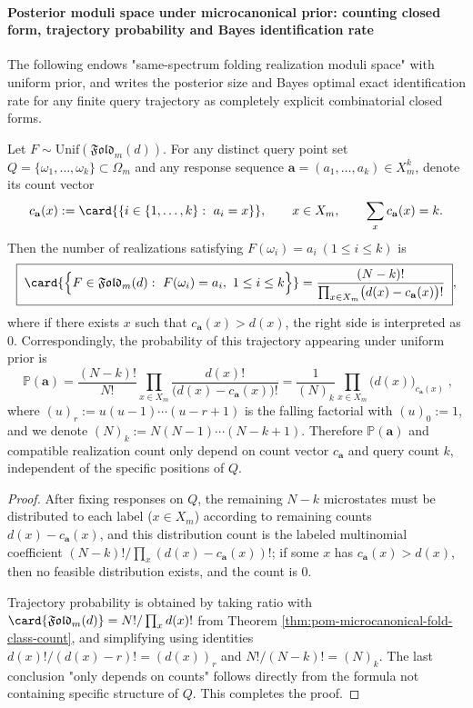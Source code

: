 \paragraph{Posterior moduli space under microcanonical prior: counting closed form, trajectory probability and Bayes identification rate}
The following endows "same-spectrum folding realization moduli space" with uniform prior, and writes the posterior size and Bayes optimal exact identification rate for any finite query trajectory as completely explicit combinatorial closed forms.

\begin{theorem}\label{thm:pom-microcanonical-fold-posterior-count-and-prob}
Let \(F\sim\mathrm{Unif}(\mathfrak{Fold}_m(d))\).
For any distinct query point set \(Q=\{\omega_1,\dots,\omega_k\}\subset\Omega_m\) and any response sequence \(\mathbf{a}=(a_1,\dots,a_k)\in X_m^k\), denote its count vector
\[
c_{\mathbf{a}}(x):=\card{\{i\in\{1,\dots,k\}:\ a_i=x\}},\qquad x\in X_m,\qquad \sum_{x}c_{\mathbf{a}}(x)=k.
\]
Then the number of realizations satisfying \(F(\omega_i)=a_i\ (1\le i\le k)\) is
\[
\boxed{\;
\card{\Bigl\{F\in\mathfrak{Fold}_m(d):\ F(\omega_i)=a_i,\ 1\le i\le k\Bigr\}}
=\frac{(N-k)!}{\prod_{x\in X_m}\bigl(d(x)-c_{\mathbf{a}}(x)\bigr)!}\;},
\]
where if there exists \(x\) such that \(c_{\mathbf{a}}(x)>d(x)\), the right side is interpreted as \(0\).
Correspondingly, the probability of this trajectory appearing under uniform prior is
\[
\boxed{\;
\mathbb{P}(\mathbf{a})
=\frac{(N-k)!}{N!}\prod_{x\in X_m}\frac{d(x)!}{\bigl(d(x)-c_{\mathbf{a}}(x)\bigr)!}
=\frac{1}{(N)_k}\prod_{x\in X_m}\bigl(d(x)\bigr)_{c_{\mathbf{a}}(x)}\;},
\]
where \((u)_r:=u(u-1)\cdots(u-r+1)\) is the falling factorial with \((u)_0:=1\), and we denote \((N)_k:=N(N-1)\cdots(N-k+1)\).
Therefore \(\mathbb{P}(\mathbf{a})\) and compatible realization count only depend on count vector \(c_{\mathbf{a}}\) and query count \(k\), independent of the specific positions of \(Q\).
\end{theorem}
\begin{proof}
After fixing responses on \(Q\), the remaining \(N-k\) microstates must be distributed to each label (\(x\in X_m\)) according to remaining counts
\(
d(x)-c_{\mathbf{a}}(x)
\),
and this distribution count is the labeled multinomial coefficient
\(
(N-k)!/\prod_x(d(x)-c_{\mathbf{a}}(x))!
\);
if some \(x\) has \(c_{\mathbf{a}}(x)>d(x)\), then no feasible distribution exists, and the count is \(0\).
\par
Trajectory probability is obtained by taking ratio with
\(
\card{\mathfrak{Fold}_m(d)}=N!/\prod_x d(x)!
\)
from Theorem \ref{thm:pom-microcanonical-fold-class-count}, and simplifying using identities
\(
d(x)!/(d(x)-r)!= (d(x))_{r}
\)
and
\(
N!/(N-k)!=(N)_k
\).
The last conclusion "only depends on counts" follows directly from the formula not containing specific structure of \(Q\). This completes the proof.
\end{proof}

